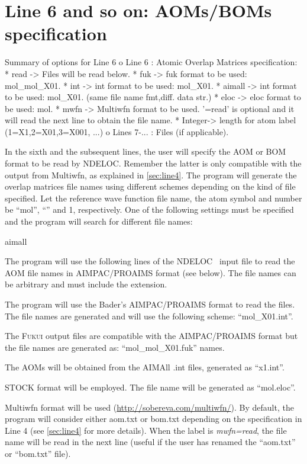 \documentclass[a4paper,11pt,openany]{memoir}
\newcommand\programa{\textsc{NDELOC}}
\begin{document}
\section{Line 6 and so on: \acp{AOM}/\acp{BOM} specification}\label{sec:line6}
\begin{recuadro}{Summary of options for Line 6}
o Line 6      : Atomic Overlap Matrices specification:
 *  read   -> Files will be read below.
 *  fuk    -> fuk format to be used: mol_mol_X01.
 *  int    -> int format to be used: mol_X01.
 *  aimall -> int format to be used: mol_X01.
              (same file name fmt,diff. data str.)
 *  eloc   -> eloc format to be used: mol.
 *  mwfn   -> Multiwfn format to be used. '=read' is optional and it will read
              the next line to obtain the file name.                              
 *  Integer-> length for atom label (1=X1,2=X01,3=X001, ...)
o Lines 7-... : Files (if applicable).
\end{recuadro}
In the sixth and the subsequent lines, the user will specify the \ac{AOM} or \acf{BOM} format to be read by \programa. Remember the latter is only compatible with the output from Multiwfn, as explained in \autoref{sec:line4}. The program will generate the overlap matrices file names using different schemes depending on the kind of file specified. Let the reference wave function file name, the atom symbol and number be ``mol'', ``'' and 1, respectively. One of the following settings must be specified and the program will search for different file names:
\begin{labeling}{aimall}
	\item[read] The program will use the following lines of the \programa~ input file to read the \ac{AOM} file names in AIMPAC/PROAIMS format (see below). The file names can be arbitrary and must include the extension.
	\item[int] The program will use the Bader's AIMPAC/PROAIMS format to read the files. The file names are generated and will use the following scheme: ``mol\_X01.int''.
	\item[fuk] The \textsc{Fukui} output files are compatible with the AIMPAC/PROAIMS format but the file names are generated as: ``mol\_mol\_X01.fuk'' names.
	\item[aimall] The \acp{AOM} will be obtained from the AIMAll .int files, generated as ``x1.int''.
	\item[eloc] STOCK format will be employed. The file name will be generated as ``mol.eloc''.
	\item[mwfn] Multiwfn format will be used (\url{http://sobereva.com/multiwfn/}). By default, the program will consider either aom.txt or bom.txt depending on the specification in Line 4 (see \autoref{sec:line4} for more details). When the label is \emph{mwfn=read}, the file name will be read in the next line (useful if the user has renamed the ``aom.txt'' or ``bom.txt'' file).
\end{labeling}
\end{document}
